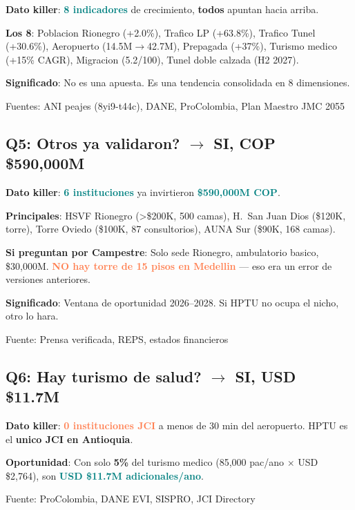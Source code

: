 \documentclass[11pt, a4paper]{article}
\newcommand{\hl}[1]{\textcolor{teal}{\textbf{#1}}}
\newcommand{\dg}[1]{\textcolor{coral}{\textbf{#1}}}
\begin{document}
\begin{tip}
\textbf{Dato killer}: \hl{8 indicadores} de crecimiento, \textbf{todos} apuntan hacia arriba.

\vspace{2pt}
\textbf{Los 8}: Poblacion Rionegro (+2.0\%), Trafico LP (+63.8\%), Trafico Tunel (+30.6\%), Aeropuerto (14.5M$\to$42.7M), Prepagada (+37\%), Turismo medico (+15\% CAGR), Migracion (5.2/100), Tunel doble calzada (H2 2027).

\vspace{2pt}
\textbf{Significado}: No es una apuesta. Es una tendencia consolidada en 8 dimensiones.

\vspace{2pt}
{\small\color{slate}Fuentes: ANI peajes (8yi9-t44c), DANE, ProColombia, Plan Maestro JMC 2055}
\end{tip}

\subsection{Q5: Otros ya validaron? $\to$ SI, COP \$590,000M}

\begin{tip}
\textbf{Dato killer}: \hl{6 instituciones} ya invirtieron \hl{\$590,000M COP}.

\vspace{2pt}
\textbf{Principales}: HSVF Rionegro (>\$200K, 500 camas), H.\ San Juan Dios (\$120K, torre), Torre Oviedo (\$100K, 87 consultorios), AUNA Sur (\$90K, 168 camas).

\vspace{2pt}
\textbf{Si preguntan por Campestre}: Solo sede Rionegro, ambulatorio basico, \$30,000M. \dg{NO hay torre de 15 pisos en Medellin} --- eso era un error de versiones anteriores.

\vspace{2pt}
\textbf{Significado}: Ventana de oportunidad 2026--2028. Si HPTU no ocupa el nicho, otro lo hara.

\vspace{2pt}
{\small\color{slate}Fuente: Prensa verificada, REPS, estados financieros}
\end{tip}

\subsection{Q6: Hay turismo de salud? $\to$ SI, USD \$11.7M}

\begin{tip}
\textbf{Dato killer}: \dg{0 instituciones JCI} a menos de 30 min del aeropuerto. HPTU es el \textbf{unico JCI en Antioquia}.

\vspace{2pt}
\textbf{Oportunidad}: Con solo \textbf{5\%} del turismo medico (85,000 pac/ano $\times$ USD \$2,764), son \hl{USD \$11.7M adicionales/ano}.

\vspace{2pt}
{\small\color{slate}Fuente: ProColombia, DANE EVI, SISPRO, JCI Directory}
\end{tip}
\end{document}
